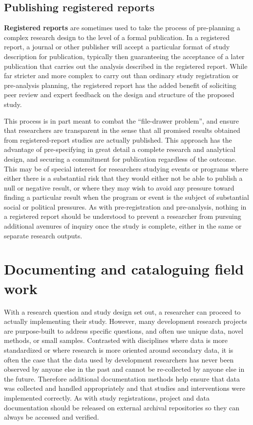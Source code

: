 
\subsection{Publishing registered reports}

\textbf{Registered reports}
are sometimes used to take the process of pre-planning a complex research design
to the level of a formal publication.
In a registered report, a journal or other publisher
will accept a particular format of study description for publication,
typically then guaranteeing the acceptance of a later publication
that carries out the analysis described in the registered report.
While far stricter and more complex to carry out than
ordinary study registration or pre-analysis planning,
the registered report has the added benefit
of soliciting peer review and expert feedback
on the design and structure of the proposed study.

This process is in part meant to combat the ``file-drawer problem'',\cite{simonsohn2014p}
and ensure that researchers are transparent in the sense that
all promised results obtained from registered-report studies are actually published.
This approach has the advantage of pre-specifying in great detail
a complete research and analytical design,
and securing a commitment for publication regardless of the outcome.
This may be of special interest for researchers
studying events or programs where either there is a substantial risk
that they would either not be able to publish a null or negative result,
or where they may wish to avoid any pressure toward finding a particular result
when the program or event is the subject of substantial social or political pressures.
As with pre-registration and pre-analysis,
nothing in a registered report should be understood
to prevent a researcher from pursuing additional avenures of inquiry
once the study is complete, either in the same or separate research outputs.

\section{Documenting and cataloguing field work}

With a research question and study design set out,
a researcher can proceed to actually implementing their study.
However, many development research projects are purpose-built
to address specific questions,
and often use unique data, novel methods, or small samples.
Contrasted with disciplines where data is more standardized
or where research is more oriented around secondary data,
it is often the case that the data used by development researchers
has never been observed by anyone else in the past
and cannot be re-collected by anyone else in the future.
Therefore additional documentation methods help ensure
that data was collected and handled appropriately
and that studies and interventions were implemented correctly.
As with study registrations, project and data documentation
should be released on external archival repositories
so they can always be accessed and verified.

